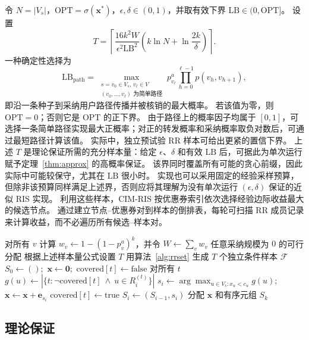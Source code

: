 \documentclass[sigconf,balance=false]{acmart}
\newcommand{\CIMRIS}{\textsc{CIM-RIS}}
\begin{document}
令 $N=|V_s|$，$\mathrm{OPT}=\sigma(\bm{x}^*)$，$\epsilon,\delta\in(0,1)$，并取有效下界 $\mathrm{LB}\in(0,\mathrm{OPT}]$。
设置
\[
  T=\left\lceil
    \frac{16k^2W}{\epsilon^2\mathrm{LB}^2}
    \left(k\ln N+\ln\frac{2k}{\delta}\right)
  \right\rceil.
\]
一种确定性选择为
\[
  \mathrm{LB}_{\mathrm{path}}
  =\max_{\substack{s=v_0\in V_s,\,v_\ell\in V\\
                   (v_0,\ldots,v_\ell)\text{ 为简单路径}}}
    p_{v_\ell}^a\prod_{h=0}^{\ell-1}p(v_h,v_{h+1}),
\]
即沿一条种子到采纳用户路径传播并被核销的最大概率。
若该值为零，则 $\mathrm{OPT}=0$；否则它是 $\mathrm{OPT}$ 的正下界。
由于路径上的概率因子均属于 $[0,1]$，可选择一条简单路径实现最大正概率；对正的转发概率和采纳概率取负对数后，可通过最短路径计算该值。
实际中，独立预试验 RR 样本可给出更紧的置信下界。
上述 $T$ 是理论保证所需的充分样本量：给定 $\epsilon$、$\delta$ 和有效 $\mathrm{LB}$ 后，可据此为单次运行赋予定理~\ref{thm:approx} 的高概率保证。
该界同时覆盖所有可能的贪心前缀，因此实际中可能较保守，尤其在 $\mathrm{LB}$ 很小时。
实现也可以采用固定的经验采样预算，但除非该预算同样满足上述界，否则应将其理解为没有单次运行 $(\epsilon,\delta)$ 保证的近似 RIS 实现。
利用这些样本，\CIMRIS{} 按优惠券索引依次选择经验边际收益最大的候选节点。
通过建立节点--优惠券对到样本的倒排表，每轮可扫描 RR 成员记录来计算收益，而不必遍历所有候选--样本对。

\begin{algorithm}[t]
\caption{\CIMRIS{}$(G,V_s,\bm{c},k,\epsilon,\delta,\mathrm{LB})$}
\label{alg:cim-ris}
\begin{algorithmic}[1]
\State 对所有 $v$ 计算 $w_v\gets1-(1-p_v^a)^k$，并令
  $W\gets\sum_v w_v$
  \State \Return 任意采纳规模为 $0$ 的可行分配
\EndIf
\State 根据上述样本量公式设置 $T$
\State 用算法~\ref{alg:rrset} 生成 $T$ 个独立条件样本 $\mathcal{F}$
\State $S_0\gets()$;\ $\bm{x}\gets\bm{0}$;\
  $\mathrm{covered}[t]\gets\mathrm{false}$ 对所有 $t$
    \State $g(u)\gets
      |\{t:\neg\mathrm{covered}[t]\ \wedge\ u\in R_i^{(t)}\}|$
  \EndFor
  \State $s_i\gets\arg\max_{u\in V_s:x_u<c_u}g(u)$;\
    $\bm{x}\gets\bm{x}+\bm{e}_{s_i}$
    \State $\mathrm{covered}[t]\gets\mathrm{true}$
  \EndFor
  \State $S_i\gets(S_{i-1},s_i)$
\EndFor
\State \Return 分配 $\bm{x}$ 和有序元组 $S_k$
\end{algorithmic}
\end{algorithm}

\subsection{理论保证}
\end{document}
